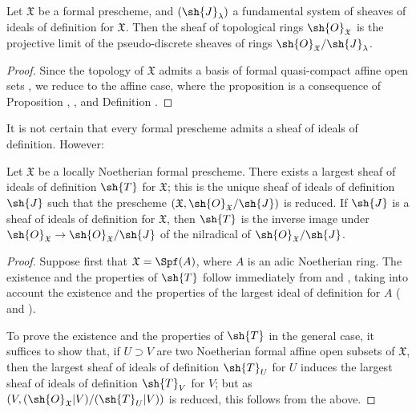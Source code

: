 \begin{proposition}[10.5.3]
\label{I.10.5.3}
Let $\mathfrak{X}$ be a formal prescheme, and $(\sh{J}_\lambda)$ a fundamental system of sheaves of ideals of definition for $\mathfrak{X}$.
Then the sheaf of topological rings $\sh{O}_\mathfrak{X}$ is the projective limit of the pseudo-discrete sheaves of rings  $\sh{O}_\mathfrak{X}/\sh{J}_\lambda$.
\end{proposition}

\begin{proof}
Since the topology of $\mathfrak{X}$ admits a basis of formal quasi-compact affine open sets , we reduce to the affine case, where the proposition is a consequence of Proposition , , and Definition .
\end{proof}

It is not certain that every formal prescheme admits a sheaf of ideals of definition.
However:
\begin{proposition}[10.5.4]
\label{I.10.5.4}
Let $\mathfrak{X}$ be a locally Noetherian formal prescheme.
There exists a largest sheaf of ideals of definition $\sh{T}$ for $\mathfrak{X}$; this is the unique sheaf of ideals of definition $\sh{J}$ such that the prescheme $(\mathfrak{X},\sh{O}_\mathfrak{X}/\sh{J})$ is reduced.
If $\sh{J}$ is a sheaf of ideals of definition for $\mathfrak{X}$, then $\sh{T}$ is the inverse image under $\sh{O}_\mathfrak{X}\to\sh{O}_\mathfrak{X}/\sh{J}$ of the nilradical of $\sh{O}_\mathfrak{X}/\sh{J}$.
\end{proposition}

\begin{proof}
Suppose first that $\mathfrak{X}=\Spf(A)$, where $A$ is an adic Noetherian ring.
The existence and the properties of $\sh{T}$ follow immediately from   and , taking into account the existence and the properties of the largest ideal of definition for $A$ ( and ).

To prove the existence and the properties of $\sh{T}$ in the general case, it suffices to show that, if $U\supset V$ are two Noetherian formal affine open subsets of $\mathfrak{X}$, then the largest sheaf of ideals of definition $\sh{T}_U$ for $U$ induces the largest sheaf of ideals of definition $\sh{T}_V$ for $V$; but as $(V,(\sh{O}_\mathfrak{X}|V)/(\sh{T}_U|V))$ is reduced, this follows from the above.
\end{proof}

